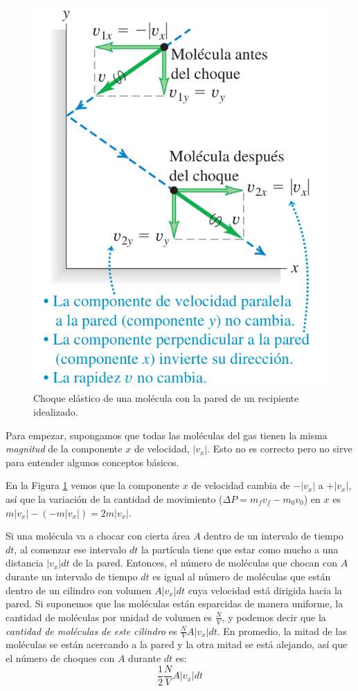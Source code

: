 \documentclass[12pt]{article}
\begin{document}
  \begin{figure}[H]
    \centering
    \includegraphics[width=0.5\linewidth]{imagenes/choque-molecula-gas.png}
    \caption{Choque elástico de una molécula con la pared de un recipiente idealizado.}
    \label{fig:choque-gas}
  \end{figure}
  
  Para empezar, supongamos que todas las moléculas del gas tienen la misma \textit{magnitud} de la componente $ x $ de velocidad, $ \left|v_{x}\right| $. Esto no es correcto pero no sirve para entender algunos conceptos básicos.

  En la Figura \ref{fig:choque-gas} vemos que la componente $ x $ de velocidad cambia de $ -\left|v_{x}\right| $ a $ +\left|v_{x}\right| $, así que la variación de la cantidad de movimiento ($ \Delta P = m_{f}v_{f}-m_{0}v_{0} $) en $ x $ es $ m\left|v_{x}\right| - (-m\left|v_{x}\right|) = 2m\left|v_{x}\right| $.

  Si una molécula va a chocar con cierta área $ A $ dentro de un intervalo de tiempo $ dt $, al comenzar ese intervalo $ dt $ la partícula tiene que estar como mucho a una distancia $ \left|v_{x}\right|dt $ de la pared. Entonces, el número de moléculas que chocan con $ A $ durante un intervalo de tiempo $ dt $ es igual al número de moléculas que están dentro de un cilindro con volumen $ A\left|v_{x}\right|dt $ cuya velocidad está dirigida hacia la pared. Si suponemos que las moléculas están esparcidas de manera uniforme, la cantidad de moléculas por unidad de volumen es $ \frac{N}{V} $, y podemos decir que la \textit{cantidad de moléculas de este cilindro} es $ \frac{N}{V}A\left|v_{x}\right|dt $. En promedio, la mitad de las moléculas se están acercando a la pared y la otra mitad se está alejando, así que el número de choques con $ A $ durante $ dt $ es:
  \[
  \frac{1}{2}\frac{N}{V}A\left|v_{x}\right|dt
  \]
  
\end{document}
